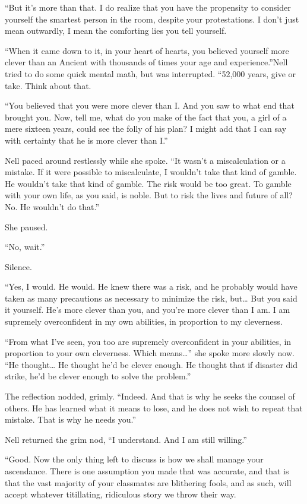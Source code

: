 “But it’s more than that.  I do realize that you have the propensity to consider yourself the smartest person in the room, despite your protestations. I don’t just mean outwardly, I mean the comforting lies you tell yourself.

“When it came down to it, in your heart of hearts, you believed yourself more clever than an Ancient with thousands of times your age and experience.”Nell tried to do some quick mental math, but was interrupted. “52,000 years, give or take. Think about that.

“You believed that you were more clever than I. And you saw to what end that brought you. Now, tell me, what do you make of the fact that you, a girl of a mere sixteen years, could see the folly of his plan? I might add that I can say with certainty that he is more clever than I.”

Nell paced around restlessly while she spoke. “It wasn’t a miscalculation or a mistake. If it were possible to miscalculate, I wouldn’t take that kind of gamble. He wouldn’t take that kind of gamble. The risk would be too great. To gamble with your own life, as you said, is noble. But to risk the lives and future of all? No. He wouldn’t do that.”

She paused.

“No, wait.”

Silence.

“Yes, I would. He would. He knew there was a risk, and he probably would have taken as many precautions as necessary to minimize the risk, but… But you said it yourself. He’s more clever than you, and you’re more clever than I am. I am supremely overconfident in my own abilities, in proportion to my cleverness.

“From what I’ve seen, you too are supremely overconfident in your abilities, in proportion to your own cleverness. Which means…” she spoke more slowly now. “He thought… He thought he’d be clever enough. He thought that if disaster did strike, he’d be clever enough to solve the problem.”

The reflection nodded, grimly. “Indeed. And that is why he seeks the counsel of others. He has learned what it means to lose, and he does not wish to repeat that mistake. That is why he needs you.”

Nell returned the grim nod, “I understand. And I am still willing.”

“Good. Now the only thing left to discuss is how we shall manage your ascendance. There is one assumption you made that was accurate, and that is that the vast majority of your classmates are blithering fools, and as such, will accept whatever titillating, ridiculous story we throw their way.

